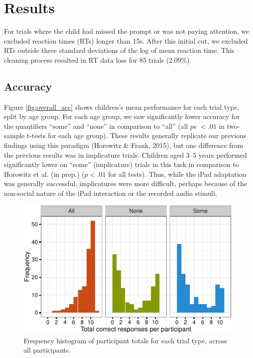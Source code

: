 \documentclass[10pt, letterpaper]{article}
\newenvironment{CodeChunk}{}{}
\begin{document}
\section{Results}\label{results}

For trials where the child had missed the prompt or was not paying
attention, we excluded reaction times (RTs) longer than 15s. After this
initial cut, we excluded RTs outside three standard deviations of the
log of mean reaction time. This cleaning process resulted in RT data
loss for 85 trials (2.09\%).

\subsection{Accuracy}\label{accuracy}

Figure \ref{fig:overall_acc} shows children's mean performance for each
trial type, split by age group. For each age group, we saw significantly
lower accuracy for the quantifiers ``some'' and ``none'' in comparison
to ``all'' (all \(p\)s \(< .01\) in two-sample t-tests for each age
group). These results generally replicate our previous findings using
this paradigm (Horowitz \& Frank, 2015), but one difference from the
previous results was in implicature trials. Children aged 3--5 years
performed significantly lower on ``some'' (implicature) trials in this
task in comparison to Horowitz et al. (in prep.) (\(p < .01\) for all
tests). Thus, while the iPad adaptation was generally successful,
implicatures were more difficult, perhaps because of the non-social
nature of the iPad interaction or the recorded audio stimuli.

\begin{CodeChunk}
\begin{figure}[t]
\includegraphics{figs/diptest-1} \caption[Frequency histogram of participant totals for each trial type, across all participants]{Frequency histogram of participant totals for each trial type, across all participants.}\label{fig:diptest}
\end{figure}
\end{CodeChunk}
\end{document}
